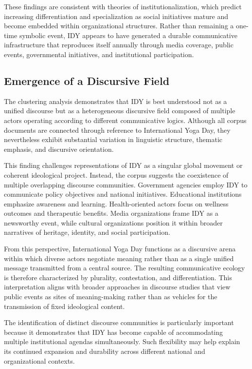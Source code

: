 \documentclass[11pt]{article}
\begin{document}
These findings are consistent with theories of institutionalization, which predict increasing differentiation and
specialization as social initiatives mature and become embedded within organizational structures. Rather than remaining
a one-time symbolic event, IDY appears to have generated a durable communicative infrastructure that reproduces itself
annually through media coverage, public events, governmental initiatives, and institutional participation.


\subsection{Emergence of a Discursive Field}



The clustering analysis demonstrates that IDY is best understood not as a unified discourse but as a heterogeneous
discursive field composed of multiple actors operating according to different communicative logics. Although all corpus
documents are connected through reference to International Yoga Day, they nevertheless exhibit substantial variation in
linguistic structure, thematic emphasis, and discursive orientation.


This finding challenges representations of IDY as a singular global movement or coherent ideological project. Instead,
the corpus suggests the coexistence of multiple overlapping discourse communities. Government agencies employ IDY to
communicate policy objectives and national initiatives. Educational institutions emphasize awareness and learning.
Health-oriented actors focus on wellness outcomes and therapeutic benefits. Media organizations frame IDY as a
newsworthy event, while cultural organizations position it within broader narratives of heritage, identity, and social
participation.


From this perspective, International Yoga Day functions as a discursive arena within which diverse actors negotiate
meaning rather than as a single unified message transmitted from a central source. The resulting communicative ecology
is therefore characterized by plurality, contestation, and differentiation. This interpretation aligns with broader
approaches in discourse studies that view public events as sites of meaning-making rather than as vehicles for the
transmission of fixed ideological content.


The identification of distinct discourse communities is particularly important because it demonstrates that IDY has
become capable of accommodating multiple institutional agendas simultaneously. Such flexibility may help explain its
continued expansion and durability across different national and organizational contexts.
\end{document}
